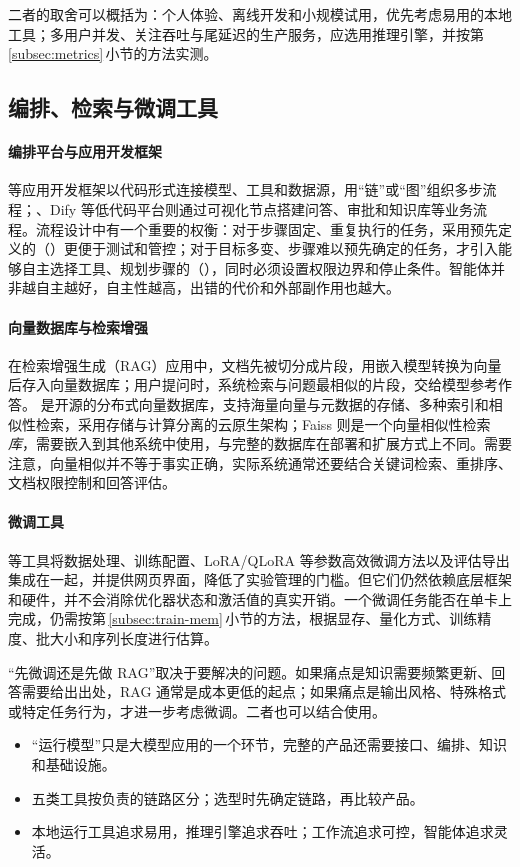 二者的取舍可以概括为：个人体验、离线开发和小规模试用，优先考虑易用的本地工具；多用户并发、关注吞吐与尾延迟的生产服务，应选用推理引擎，并按第\,\ref{subsec:metrics}\,小节的方法实测。

\subsection{编排、检索与微调工具}

\paragraph{编排平台与应用开发框架}  等应用开发框架以代码形式连接模型、工具和数据源，用“链”或“图”组织多步流程；、Dify 等低代码平台则通过可视化节点搭建问答、审批和知识库等业务流程。流程设计中有一个重要的权衡\cite{anthropic2024agents}：对于步骤固定、重复执行的任务，采用预先定义的（）更便于测试和管控；对于目标多变、步骤难以预先确定的任务，才引入能够自主选择工具、规划步骤的（），同时必须设置权限边界和停止条件。智能体并非越自主越好，自主性越高，出错的代价和外部副作用也越大。

\paragraph{向量数据库与检索增强} 在检索增强生成（RAG）应用中，文档先被切分成片段，用嵌入模型转换为向量后存入向量数据库；用户提问时，系统检索与问题最相似的片段，交给模型参考作答。 是开源的分布式向量数据库，支持海量向量与元数据的存储、多种索引和相似性检索，采用存储与计算分离的云原生架构\cite{milvus2024}；Faiss 则是一个向量相似性检索\emph{库}，需要嵌入到其他系统中使用，与完整的数据库在部署和扩展方式上不同。需要注意，向量相似并不等于事实正确，实际系统通常还要结合关键词检索、重排序、文档权限控制和回答评估。

\paragraph{微调工具}  等工具将数据处理、训练配置、LoRA/QLoRA 等参数高效微调方法\cite{hu2021lora,dettmers2023qlora}以及评估导出集成在一起，并提供网页界面，降低了实验管理的门槛。但它们仍然依赖底层框架和硬件，并不会消除优化器状态和激活值的真实开销。一个微调任务能否在单卡上完成，仍需按第\,\ref{subsec:train-mem}\,小节的方法，根据显存、量化方式、训练精度、批大小和序列长度进行估算。

\begin{pitfall}
“先微调还是先做 RAG”取决于要解决的问题。如果痛点是知识需要频繁更新、回答需要给出出处，RAG 通常是成本更低的起点；如果痛点是输出风格、特殊格式或特定任务行为，才进一步考虑微调。二者也可以结合使用。
\end{pitfall}

\begin{keypoints}
\begin{itemize}[leftmargin=1.5em]
  \item “运行模型”只是大模型应用的一个环节，完整的产品还需要接口、编排、知识和基础设施。
  \item 五类工具按负责的链路区分；选型时先确定链路，再比较产品。
  \item 本地运行工具追求易用，推理引擎追求吞吐；工作流追求可控，智能体追求灵活。
\end{itemize}
\end{keypoints}
